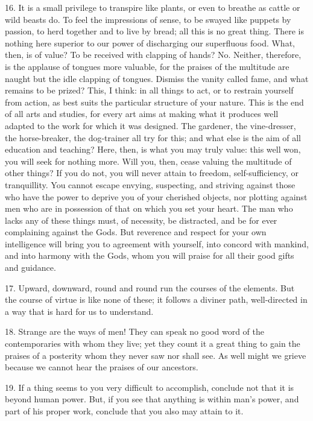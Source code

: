 \documentclass{book}
\begin{document}
16. It is a small privilege to transpire like plants, or even to
breathe as cattle or wild beasts do. To feel the impressions of sense,
to be swayed like puppets by passion, to herd together and to live by
bread; all this is no great thing. There is nothing here superior to
our power of discharging our superfluous food. What, then, is of
value? To be received with clapping of hands? No. Neither, therefore,
is the applause of tongues more valuable, for the praises of the
multitude are naught but the idle clapping of tongues. Dismiss the
vanity called fame, and what remains to be prized? This, I think: in
all things to act, or to restrain yourself from action, as best suits
the particular structure of your nature. This is the end of all arts
and studies, for every art aims at making what it produces well
adapted to the work for which it was designed. The gardener, the
vine-dresser, the horse-breaker, the dog-trainer all try for this; and
what else is the aim of all education and teaching? Here, then, is
what you may truly value: this well won, you will seek for nothing
more. Will you, then, cease valuing the multitude of other things? If
you do not, you will never attain to freedom, self-sufficiency, or
tranquillity. You cannot escape envying, suspecting, and striving
against those who have the power to deprive you of your cherished
objects, nor plotting against men who are in possession of that on
which you set your heart. The man who lacks any of these things must,
of necessity, be distracted, and be for ever complaining against the
Gods. But reverence and respect for your own intelligence will bring
you to agreement with yourself, into concord with mankind, and into
harmony with the Gods, whom you will praise for all their good gifts
and guidance.

17. Upward, downward, round and round run the courses of the
elements. But the course of virtue is like none of these; it follows a
diviner path, well-directed in a way that is hard for us to
understand.

18. Strange are the ways of men! They can speak no good word of the
contemporaries with whom they live; yet they count it a great thing to
gain the praises of a posterity whom they never saw nor shall see. As
well might we grieve because we cannot hear the praises of our
ancestors.

19. If a thing seems to you very difficult to accomplish, conclude not
that it is beyond human power. But, if you see that anything is within
man's power, and part of his proper work, conclude that you also may
attain to it.
\end{document}
